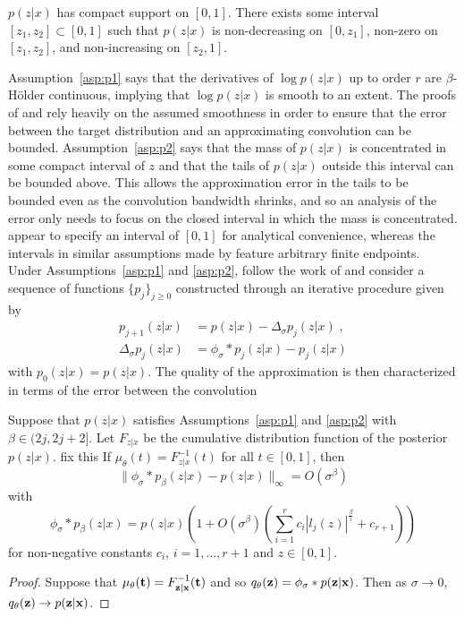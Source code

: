 \documentclass[10pt]{article}
\begin{document}
\begin{assumption} \label{asp:p2}
$p(z|x)$ has compact support on $[0,1]$. There exists some interval $[z_1,z_2]\subset[0,1]$ such that $p(z|x)$ is non-decreasing on $[0,z_1]$, non-zero on $[z_1,z_2]$, and non-increasing on $[z_2,1]$.
\end{assumption}

Assumption~\ref{asp:p1} says that the derivatives of $\log p(z|x)$ up to order $r$ are $\beta$-H\"{o}lder continuous, implying that $\log p(z|x)$ is smooth to an extent. The proofs of \citet{Kruijer:2010} and \citet{Plummer:2021} rely heavily on the assumed smoothness in order to ensure that the error between the target distribution and an approximating convolution can be bounded. Assumption~\ref{asp:p2} says that the mass of $p(z|x)$ is concentrated in some compact interval of $z$ and that the tails of $p(z|x)$ outside this interval can be bounded above. This allows the approximation error in the tails to be bounded even as the convolution bandwidth shrinks, and so an analysis of the error only needs to focus on the closed interval in which the mass is concentrated. \citet{Plummer:2021} appear to specify an interval of $[0,1]$ for analytical convenience, whereas the intervals in similar assumptions made by \citet{Ghosal:1999} feature arbitrary finite endpoints.
\\

Under Assumptions~\ref{asp:p1} and \ref{asp:p2}, \citet{Plummer:2021} follow the work of \citet{Kruijer:2010} and consider a sequence of functions $\{p_j\}_{j\geq0}$ constructed through an iterative procedure given by
\begin{align*}
p_{j+1}(z|x) &= p(z|x) - \Delta_\sigma p_j(z|x) \;, \\
\Delta_\sigma p_j(z|x) &= \phi_\sigma * p_j(z|x) - p_j(z|x)
\end{align*}
with $p_0(z|x)=p(z|x)$. The quality of the approximation is then characterized in terms of the error between the convolution \todo

\begin{proposition}
Suppose that $p(z|x)$ satisfies Assumptions~\ref{asp:p1} and \ref{asp:p2} with $\beta\in(2j,2j+2]$. Let $F_{z|x}$ be the cumulative distribution function of the posterior $p(z|x)$. \todo fix this If $\mu_\theta(t)=F_{z|x}^{-1}(t)$ for all $t\in[0,1]$, then
\[
\|\phi_\sigma * p_\beta(z|x) - p(z|x)\|_\infty = O(\sigma^\beta)
\]
with
\[
\phi_\sigma * p_\beta(z|x) = p(z|x)\left(1+O(\sigma^\beta)\left(\sum_{i=1}^rc_i|l_j(z)|^{\frac{\beta}{i}}+c_{r+1}\right)\right)
\]
for non-negative constants $c_i$, $i=1,\ldots,r+1$ and $z\in[0,1]$.
\end{proposition}
\begin{proof}
Suppose that $\mu_\theta(\mathbf{t})=F_{\mathbf{z}|\mathbf{x}}^{-1}(\mathbf{t})$ and so $q_\theta(\mathbf{z})=\phi_\sigma*p(\mathbf{z}|\mathbf{x})$. Then as $\sigma\rightarrow0$, $q_\theta(\mathbf{z})\rightarrow p(\mathbf{z}|\mathbf{x})$.
\end{proof}
\end{document}
